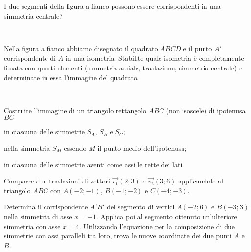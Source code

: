\noindent\begin{minipage}{0.75\textwidth}\parindent15pt
\begin{esercizio}
\label{ese:8.94} %
I due segmenti della figura a fianco possono essere corrispondenti in 
una simmetria centrale? 
\end{esercizio}
\end{minipage}\hfil
\begin{minipage}{0.25\textwidth}
	\centering~~
\end{minipage}\vspace{8pt}

\noindent\begin{minipage}{0.65\textwidth}\parindent15pt
\begin{esercizio}
\label{ese:8.95} %
Nella figura a fianco abbiamo disegnato il quadrato $ABCD$ e il punto 
$A'$ corrispondente di $A$ in una isometria. Stabilite quale 
isometria è completamente fissata con questi elementi (simmetria 
assiale, traslazione, simmetria centrale) e determinate in essa 
l'immagine del quadrato. 
\end{esercizio}
\end{minipage}\hfil
\begin{minipage}{0.35\textwidth}
	\centering~~
\end{minipage}\vspace{8pt}

\begin{esercizio}
\label{ese:8.96} %
Costruite l'immagine di un triangolo rettangolo $ABC$ (non isoscele) 
di ipotenusa $BC$
\begin{enumeratea}
\item in ciascuna delle simmetrie $S_A$, $S_B$ e $S_C$;
\item nella simmetria $S_M$ essendo $M$ il punto medio dell'ipotenusa;
\item in ciascuna delle simmetrie aventi come assi le rette dei lati.
\end{enumeratea}
\end{esercizio}

\begin{esercizio}
\label{ese:8.97} %
Comporre due traslazioni di vettori $\vec{v_1}(2;3)$ e 
$\vec{v_2}(3;6)$ applicandole al triangolo $ABC$ con $A(-2;-1)$, 
$B(-1;-2)$ e $C(-4;-3)$.
\end{esercizio}

\begin{esercizio}
\label{ese:8.98} %
Determina il corrispondente $A'B'$ del segmento di vertici $A(-2;6)$ 
e $B(-3;3)$ nella simmetria di asse $x=-1$. Applica poi al segmento 
ottenuto un'ulteriore simmetria con asse $x=4$. Utilizzando 
l'equazione per la composizione di due simmetrie con assi paralleli 
tra loro, trova le nuove coordinate dei due punti $A$ e $B$.
\end{esercizio}

